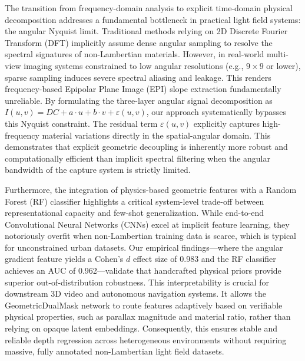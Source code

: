 The transition from frequency-domain analysis to explicit time-domain physical decomposition addresses a fundamental bottleneck in practical light field systems: the angular Nyquist limit. Traditional methods relying on 2D Discrete Fourier Transform (DFT) implicitly assume dense angular sampling to resolve the spectral signatures of non-Lambertian materials. However, in real-world multi-view imaging systems constrained to low angular resolutions (e.g., $9 \times 9$ or lower), sparse sampling induces severe spectral aliasing and leakage. This renders frequency-based Epipolar Plane Image (EPI) slope extraction fundamentally unreliable. By formulating the three-layer angular signal decomposition as $I(u,v) = DC + a\cdot u + b\cdot v + \varepsilon(u,v)$, our approach systematically bypasses this Nyquist constraint. The residual term $\varepsilon(u,v)$ explicitly captures high-frequency material variations directly in the spatial-angular domain. This demonstrates that explicit geometric decoupling is inherently more robust and computationally efficient than implicit spectral filtering when the angular bandwidth of the capture system is strictly limited.

Furthermore, the integration of physics-based geometric features with a Random Forest (RF) classifier highlights a critical system-level trade-off between representational capacity and few-shot generalization. While end-to-end Convolutional Neural Networks (CNNs) excel at implicit feature learning, they notoriously overfit when non-Lambertian training data is scarce, which is typical for unconstrained urban datasets. Our empirical findings—where the angular gradient feature yields a Cohen's $d$ effect size of 0.983 and the RF classifier achieves an AUC of 0.962—validate that handcrafted physical priors provide superior out-of-distribution robustness. This interpretability is crucial for downstream 3D video and autonomous navigation systems. It allows the GeometricDualMask network to route features adaptively based on verifiable physical properties, such as parallax magnitude and material ratio, rather than relying on opaque latent embeddings. Consequently, this ensures stable and reliable depth regression across heterogeneous environments without requiring massive, fully annotated non-Lambertian light field datasets.

